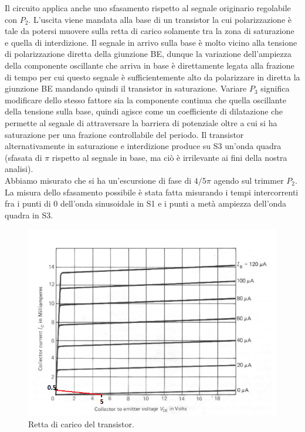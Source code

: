\documentclass[10pt,a4paper]{article}
\begin{document}
Il circuito applica anche uno sfasamento rispetto al segnale originario regolabile con $P_2$. L'uscita viene mandata alla base di un transistor la cui polarizzazione è tale da potersi muovere sulla retta di carico solamente  tra la zona di saturazione e quella di interdizione. Il segnale in arrivo sulla base è molto vicino alla tensione di polarizzazione diretta della giunzione BE, dunque la variazione dell'ampiezza della componente oscillante che arriva in base è direttamente legata alla frazione di tempo per cui questo segnale è sufficientemente alto da polarizzare in diretta la giunzione BE mandando quindi il transistor in saturazione. Variare $P_3$ significa modificare dello stesso fattore sia la componente continua che quella oscillante della tensione sulla base, quindi agisce come un coefficiente di dilatazione che permette al segnale di attraversare la barriera di potenziale oltre a cui si ha saturazione per una frazione controllabile del periodo.
Il transistor alternativamente in saturazione e interdizione produce su S3 un'onda quadra (sfasata di $\pi$ rispetto al segnale in base, ma ciò è irrilevante ai fini della nostra analisi).\\
 Abbiamo misurato che si ha un'escursione di fase di $4/5 \pi$ agendo sul trimmer $P_2$. La misura dello sfasamento possibile è stata fatta misurando i tempi intercorrenti fra i punti di 0 dell'onda sinusoidale in S1 e i punti a metà ampiezza  dell'onda quadra in S3.\\


\begin{figure}[!htb]
  \centering
  \includegraphics[scale=0.6]{transistorbjt.png}
\caption{Retta di carico del transistor.\label{fig:transistor}}
\end{figure}
\end{document}
